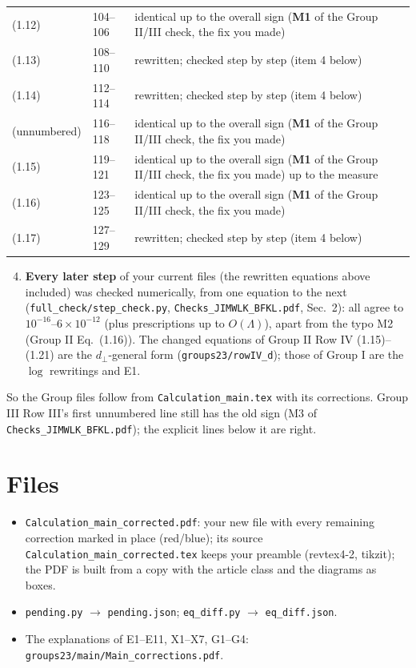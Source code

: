 \documentclass[10pt]{article}
\begin{document}
{\begin{longtable}{@{}lll@{}}
(1.12) & 104--106 & identical up to the overall sign (\textbf{M1} of the Group II/III check, the fix you made)\\
(1.13) & 108--110 & rewritten; checked step by step (item 4 below)\\
(1.14) & 112--114 & rewritten; checked step by step (item 4 below)\\
(unnumbered) & 116--118 & identical up to the overall sign (\textbf{M1} of the Group II/III check, the fix you made)\\
(1.15) & 119--121 & identical up to the overall sign (\textbf{M1} of the Group II/III check, the fix you made) up to the measure\\
(1.16) & 123--125 & identical up to the overall sign (\textbf{M1} of the Group II/III check, the fix you made)\\
(1.17) & 127--129 & rewritten; checked step by step (item 4 below)\\
\bottomrule
\end{longtable}}
\begin{enumerate}\setcounter{enumi}{3}
\item \textbf{Every later step} of your current files (the rewritten equations above included) was checked numerically, from one equation to the next (\texttt{full\_check/step\_check.py}, \texttt{Checks\_JIMWLK\_BFKL.pdf}, Sec.~2): all agree to $10^{-16}$--$6\times10^{-12}$ (plus prescriptions up to $O(\Lambda)$), apart from the typo M2 (Group II Eq.~(1.16)). The changed equations of Group II Row IV (1.15)--(1.21) are the $d_\perp$-general form (\texttt{groups23/rowIV\_d}); those of Group I are the $\log$ rewritings and E1.
\end{enumerate}
So the Group files follow from \texttt{Calculation\_main.tex} with its corrections. Group III Row III's first unnumbered line still has the old sign (M3 of \texttt{Checks\_JIMWLK\_BFKL.pdf}); the explicit lines below it are right.

\section{Files}
\begin{itemize}
\item \texttt{Calculation\_main\_corrected.pdf}: your new file with every remaining correction marked in place (red/blue); its source \texttt{Calculation\_main\_corrected.tex} keeps your preamble (revtex4-2, tikzit); the PDF is built from a copy with the article class and the diagrams as boxes.
\item \texttt{pending.py} $\to$ \texttt{pending.json}; \texttt{eq\_diff.py} $\to$ \texttt{eq\_diff.json}.
\item The explanations of E1--E11, X1--X7, G1--G4: \texttt{groups23/main/Main\_corrections.pdf}.
\end{itemize}
\end{document}
